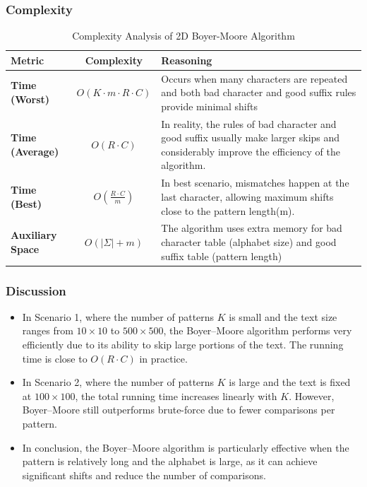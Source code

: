     \subsubsection{Complexity}
        \begin{table}[H]
        \centering
        \renewcommand{\arraystretch}{1.5}
        \begin{tabular}{|l|c|p{8cm}|}
        \hline
        \textbf{Metric} & \textbf{Complexity} & \textbf{Reasoning} \\ \hline
        \textbf{Time (Worst)} & $O(K \cdot m \cdot R \cdot C)$ & Occurs when many characters are repeated and both bad character and good suffix rules provide minimal shifts \\ \hline
        \textbf{Time (Average)} & $O(R \cdot C)$& In reality, the rules of bad character and good suffix usually make larger skips and considerably improve the efficiency of the algorithm.  \\ \hline
        \textbf{Time (Best)} & $O(\frac{R \cdot C}{m})$ & In best scenario, mismatches happen at the last character, allowing maximum shifts close to the pattern length(m). \\ \hline
        \textbf{Auxiliary Space} & $O(|\Sigma| + m)$ & The algorithm uses extra memory for bad character table (alphabet size) and good suffix table (pattern length) \\ \hline
        \end{tabular}
        \caption{Complexity Analysis of 2D Boyer-Moore Algorithm}
        \end{table}

    \subsubsection{Discussion}
    \begin{itemize}
        \item In Scenario 1, where the number of patterns $K$ is small and the text size ranges from $10 \times 10$ to $500 \times 500$, the Boyer--Moore algorithm performs very efficiently due to its ability to skip large portions of the text. The running time is close to $O(R \cdot C)$ in practice.

        \item In Scenario 2, where the number of patterns $K$ is large and the text is fixed at $100 \times 100$, the total running time increases linearly with $K$. However, Boyer--Moore still outperforms brute-force due to fewer comparisons per pattern.

        \item In conclusion, the Boyer--Moore algorithm is particularly effective when the pattern is relatively long and the alphabet is large, as it can achieve significant shifts and reduce the number of comparisons.
    \end{itemize}